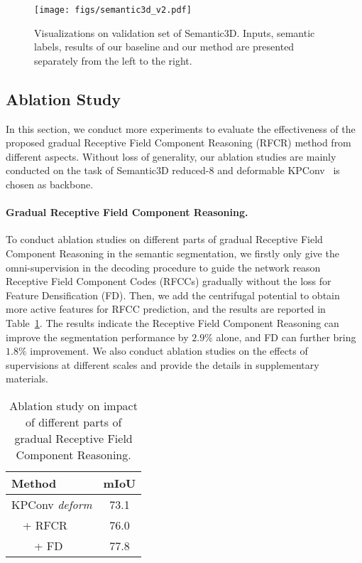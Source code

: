 \documentclass[final]{cvpr}
\begin{document}
\begin{figure}[ht]
    \centering
    \texttt{[image: figs/semantic3d\_v2.pdf]}
    \caption{Visualizations on validation set of Semantic3D. Inputs, semantic labels, results of our baseline and our method are presented separately from the left to the right.}
    \label{fig:semantic3d}
\end{figure}

\subsection{Ablation Study}
\label{subsec:ablation}
In this section, we conduct more experiments to evaluate the effectiveness of the proposed gradual Receptive Field Component Reasoning (RFCR) method from different aspects. Without loss of generality, our ablation studies are mainly conducted on the task of Semantic3D reduced-8 and deformable KPConv~\cite{thomas2019kpconv} is chosen as backbone.

\paragraph{Gradual Receptive Field Component Reasoning.}
To conduct ablation studies on different parts of gradual Receptive Field Component Reasoning in the semantic segmentation, we firstly only give the omni-supervision in the decoding procedure to guide the network reason Receptive Field Component Codes (RFCCs) gradually without the loss for Feature Densification (FD). Then, we add the centrifugal potential to obtain more active features for RFCC prediction, and the results are reported in Table~\ref{tab:ablation}. The results indicate the Receptive Field Component Reasoning can improve the segmentation performance by $2.9\%$ alone, and FD can further bring $1.8\%$ improvement. We also conduct ablation studies on the effects of supervisions at different scales and provide the details in supplementary materials.

\begin{table}
\centering
\begin{tabular}{lc} 
\toprule
Method  & mIoU \\
\midrule
KPConv \textit{deform} & 73.1\\
\ \ + RFCR& 76.0\\
\ \ \ \ + FD& 77.8 \\
\bottomrule
\end{tabular}
\caption{Ablation study on impact of different parts of gradual Receptive Field Component Reasoning.}
\label{tab:ablation}
\end{table}
\end{document}
